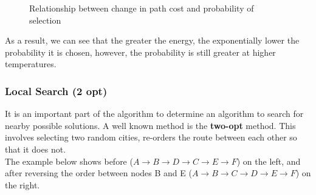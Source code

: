 \documentclass{article}
\begin{document}
\begin{figure}[H]
    \centering
    \caption{Relationship between change in path cost and probability of selection}
\end{figure}

As a result, we can see that the greater the energy, the exponentially lower the probability it is chosen, however, the probability is still greater at higher temperatures.
\\

\subsubsection{Local Search (2 opt)}

It is an important part of the algorithm to determine an algorithm to search for nearby possible solutions.
A well known method is the \textbf{two-opt} method.
This involves selecting two random cities, re-orders the route between each other so that it does not.
\\

The example below shows before ($A \rightarrow B \rightarrow D \rightarrow C \rightarrow E \rightarrow F$) on the left, and after reversing the order between nodes B and E ($A \rightarrow B \rightarrow C \rightarrow D \rightarrow E \rightarrow F$) on the right.
\end{document}
